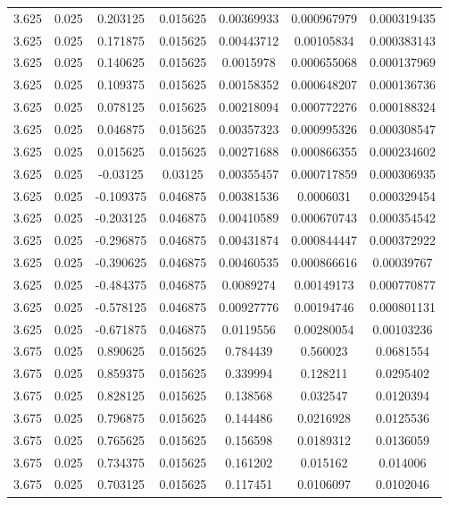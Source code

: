 \begin{flushleft}
\begin{longtable}{ccccccc}
3.625 & 0.025 & 0.203125 & 0.015625 & 0.00369933 & 0.000967979 & 0.000319435  \\ 
3.625 & 0.025 & 0.171875 & 0.015625 & 0.00443712 & 0.00105834 & 0.000383143  \\ 
3.625 & 0.025 & 0.140625 & 0.015625 & 0.0015978 & 0.000655068 & 0.000137969  \\ 
3.625 & 0.025 & 0.109375 & 0.015625 & 0.00158352 & 0.000648207 & 0.000136736  \\ 
3.625 & 0.025 & 0.078125 & 0.015625 & 0.00218094 & 0.000772276 & 0.000188324  \\ 
3.625 & 0.025 & 0.046875 & 0.015625 & 0.00357323 & 0.000995326 & 0.000308547  \\ 
3.625 & 0.025 & 0.015625 & 0.015625 & 0.00271688 & 0.000866355 & 0.000234602  \\ 
3.625 & 0.025 & -0.03125 & 0.03125 & 0.00355457 & 0.000717859 & 0.000306935  \\ 
3.625 & 0.025 & -0.109375 & 0.046875 & 0.00381536 & 0.0006031 & 0.000329454  \\ 
3.625 & 0.025 & -0.203125 & 0.046875 & 0.00410589 & 0.000670743 & 0.000354542  \\ 
3.625 & 0.025 & -0.296875 & 0.046875 & 0.00431874 & 0.000844447 & 0.000372922  \\ 
3.625 & 0.025 & -0.390625 & 0.046875 & 0.00460535 & 0.000866616 & 0.00039767  \\ 
3.625 & 0.025 & -0.484375 & 0.046875 & 0.0089274 & 0.00149173 & 0.000770877  \\ 
3.625 & 0.025 & -0.578125 & 0.046875 & 0.00927776 & 0.00194746 & 0.000801131  \\ 
3.625 & 0.025 & -0.671875 & 0.046875 & 0.0119556 & 0.00280054 & 0.00103236  \\ 
3.675 & 0.025 & 0.890625 & 0.015625 & 0.784439 & 0.560023 & 0.0681554  \\ 
3.675 & 0.025 & 0.859375 & 0.015625 & 0.339994 & 0.128211 & 0.0295402  \\ 
3.675 & 0.025 & 0.828125 & 0.015625 & 0.138568 & 0.032547 & 0.0120394  \\ 
3.675 & 0.025 & 0.796875 & 0.015625 & 0.144486 & 0.0216928 & 0.0125536  \\ 
3.675 & 0.025 & 0.765625 & 0.015625 & 0.156598 & 0.0189312 & 0.0136059  \\ 
3.675 & 0.025 & 0.734375 & 0.015625 & 0.161202 & 0.015162 & 0.014006  \\ 
3.675 & 0.025 & 0.703125 & 0.015625 & 0.117451 & 0.0106097 & 0.0102046  \\ 

\end{longtable}
\end{flushleft}
